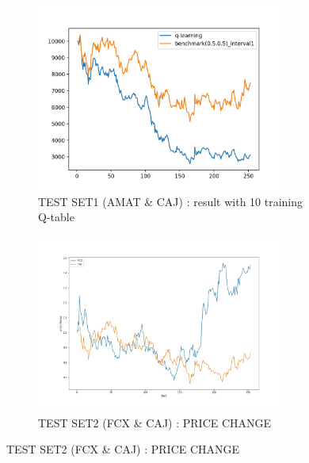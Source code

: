 \begin{figure}[H]
\begin{figure}[H]
\begin{center}
\includegraphics[clip, width=0.9\textwidth]{Graphics/test_NS10_AC_action.jpg} \caption{TEST SET1 (AMAT \& CAJ) : result with 10 training Q-table}
\end{center}
\end{figure}
\vspace{0.1cm}
\begin{figure}[H]
\begin{center}
\includegraphics[clip, width=0.9\textwidth]{Graphics/test2_pricechange.jpg} \caption{TEST SET2 (FCX \& CAJ) : PRICE CHANGE}
\end{center}
\end{figure}
\vspace{0.1cm}
\end{figure}

